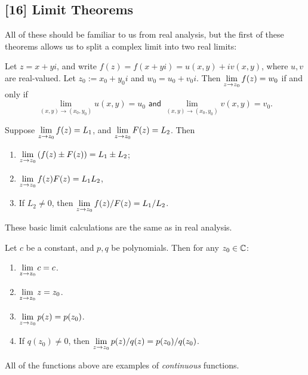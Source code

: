 \documentclass{article}
\begin{document}
\subsection*{[16] Limit Theorems}
All of these should be familiar to us from real analysis, but the first of these theorems allows us to split a complex limit into two real limits:
\begin{theorem}
Let $z=x+yi$, and write $f(z) = f(x+yi) = u(x,y) + iv(x,y)$, where $u,v$ are real-valued. Let $z_0 := x_0+y_0i$ and $w_0 = u_0 + v_0i$. Then $\displaystyle\lim_{z\to z_0} f(z) = w_0$ if and only if
$$\lim_{(x,y)\to (x_0,y_0)} u(x,y) = u_0 \textsf{ and } \lim_{(x,y)\to (x_0, y_0)} v(x,y) = v_0.$$
\end{theorem}
\begin{theorem} Suppose $\displaystyle\lim_{z\to z_0} f(z) = L_1$, and $\displaystyle\lim_{z \to z_0} F(z) = L_2$. Then
\begin{enumerate}
    \item $\displaystyle\lim_{z\to z_0}\left(f(z) \pm F(z) \right) = L_1\pm L_2$;
    \item $\displaystyle\lim_{z\to z_0} f(z)F(z) = L_1L_2$,
    \item If $L_2\neq 0$, then $\displaystyle\lim_{z\to z_0} f(z)/F(z) = L_1/L_2$.
\end{enumerate}
\end{theorem}
These basic limit calculations are the same as in real analysis.
\newpage
\begin{example}
Let $c$ be a constant, and $p,q$ be polynomials. Then for any $z_0\in \mathbb C$:
\begin{enumerate}
    \item $\displaystyle\lim_{z\to z_0} c= c$.
    \item $\displaystyle\lim_{z\to z_0} z= z_0$.
    \item $\displaystyle\lim_{z\to z_0} p(z) = p(z_0)$.
    \item If $q(z_0)\neq 0$, then $\displaystyle\lim_{z\to z_0} p(z)/q(z) = p(z_0)/q(z_0)$.
\end{enumerate}
\end{example}
All of the functions above are examples of \textit{continuous} functions.
\end{document}
